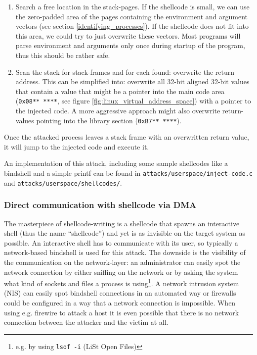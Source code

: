 \begin{enumerate}

	\item Search a free location in the stack-pages. If the shellcode is
		small, we can use the zero-padded area of the pages containing
		the environment and argument vectors (see section
		\ref{identifying_processes}). If the shellcode does not fit into
		this area, we could try to just overwrite these vectors. Most
		programs will parse environment and arguments only once during
		startup of the program, thus this should be rather safe.

	\item Scan the stack for stack-frames and for each found: overwrite the
		return address. This can be simplified into: overwrite all
		32-bit aligned 32-bit values that contain a value that might be
		a pointer into the main code area (\texttt{0x08**~****}, see
		figure \ref{fig:linux_virtual_address_space}) with a pointer to
		the injected code.  A more aggressive approach might also
		overwrite return-values pointing into the library section
		(\texttt{0xB7**~****}).

\end{enumerate}

Once the attacked process leaves a stack frame with an overwritten return value,
it will jump to the injected code and execute it.

An implementation of this attack, including some sample shellcodes like a
bindshell and a simple printf can be found in
\texttt{attacks/userspace/inject-code.c} and \linebreak
\texttt{attacks/userspace/shellcodes/}.


\subsubsection{Direct communication with shellcode via DMA}

\label{communication_DMA} The masterpiece of shellcode-writing is a shellcode
that spawns an interactive shell (thus the name ``shellcode'') and yet is as
invisible on the target system as possible.  An interactive shell has to
communicate with its user, so typically a network-based bindshell is used for
this attack. The downside is the visibility of the communication on the
network-layer: an administrator can easily spot the network connection by either
sniffing on the network or by asking the system what kind of sockets and files a
process is using\footnote{e.g. by using \texttt{lsof -i} (LiSt Open Files)}. A
network intrusion system (NIS) can easily spot bindshell connections in an
automated way or firewalls could be configured in a way that a network
connection is impossible. When using e.g. firewire to attack a host it is even
possible that there is no network connection between the attacker and the victim
at all.

